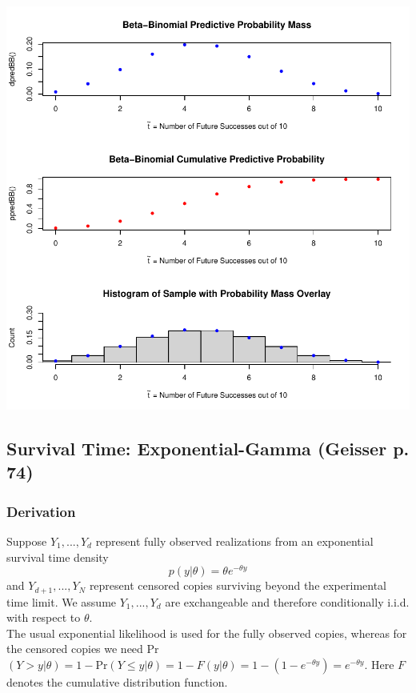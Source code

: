 \documentclass[12pt, a4paper]{article}
\begin{document}
\includegraphics{Thesis_v4-003}



    \subsection{Survival Time:  Exponential-Gamma (Geisser p. 74)}

    \subsubsection{Derivation}

Suppose $Y_1,...,Y_d$ represent fully observed realizations from an exponential survival time density
          $$p(y|\theta) = \theta e^{-\theta y}$$
      and $Y_{d+1},...,Y_N$ represent censored copies surviving beyond the experimental time limit.  We assume $Y_1,...,Y_d$ are exchangeable and therefore conditionally i.i.d. with respect to $\theta$.\\

\noindent The usual exponential likelihood is used for the fully observed copies, whereas for the censored copies we need Pr$(Y > y | \theta) = 1 - \text{Pr}(Y\leq y | \theta) = 1 - F(y|\theta) = 1 - (1 - e^{-\theta y}) = e^{-\theta y}$.  Here $F$ denotes the cumulative distribution function.\\
\end{document}

